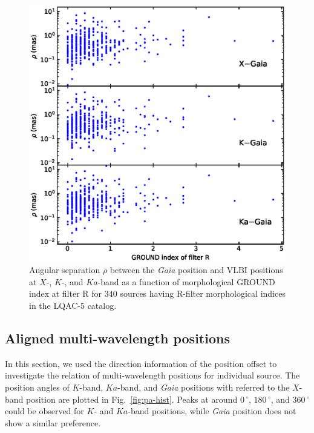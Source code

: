 \documentclass{aa-note}   %
\begin{document}
\begin{figure}[hbtp]
    \centering
    \includegraphics[width=\columnwidth]{figs/rho-I3R}
    \caption[]{\label{fig:rho-I3R}
        Angular separation $\rho$ between the {\it Gaia} position and VLBI positions at $X$-, $K$-, and $Ka$-band as a function of morphological GROUND index at filter R for 340 sources having R-filter morphological indices in the LQAC-5 catalog.
    }
\end{figure}

\subsection{Aligned multi-wavelength positions}    \label{subsec:pos-align}

In this section, we used the direction information of the position offset to investigate the relation of multi-wavelength positions for individual source.
The position angles of $K$-band, $Ka$-band, and \textit{Gaia} positions with referred to the $X$-band position are plotted in Fig.~\ref{fig:pa-hist}.
Peaks at around $0\,^\circ$, $180\,^\circ$, and $360\,^\circ$ could be observed for $K$- and $Ka$-band positions, while \textit{Gaia} position does not show a similar preference.
\end{document}
